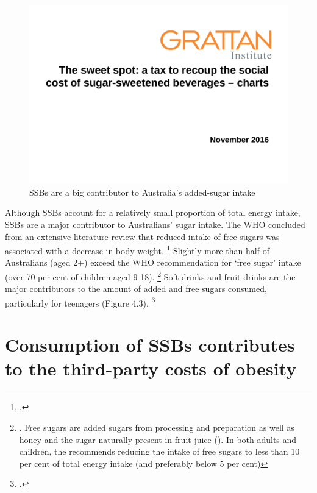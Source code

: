 \documentclass[embargoed]{grattan}
\begin{document}
\begin{figure}
\caption{SSBs are a big contributor to Australia's added-sugar intake}

\includegraphics[page=10]{atlas/ObesityCharts}

\end{figure}

Although SSBs account for a relatively small proportion of total energy intake, SSBs are a major contributor to Australians' sugar intake.
The WHO concluded from an extensive literature review that reduced intake of free sugars was associated with a decrease in body weight.%
\footcite{Organisation2015Sugarsintakeadults} Slightly more than half of Australians (aged 2+) exceed the WHO recommendation for `free sugar' intake (over 70 per cent of children aged 9-18).%
\footnote{\textcite{Lei2016Dietaryintakefood}.
Free sugars are added sugars from processing and preparation as well as honey and the sugar naturally present in fruit juice (\textcite[][Table~3.1]{ABS20164364055011AustralianHealth}).
In both adults and children, the \textcite{Organisation2015Sugarsintakeadults} recommends reducing the intake of free sugars to less than 10 per cent of total energy intake (and preferably below 5 per cent)} Soft drinks and fruit drinks are the major contributors to the amount of added and free sugars consumed, particularly for teenagers (Figure 4.3).%
\footcite{ABS20164364055011AustralianHealth}

\section{Consumption of SSBs contributes to the third-party costs of obesity}\label{consumption-of-ssbs-contributes-to-the-third-party-costs-of-obesity}
\end{document}
